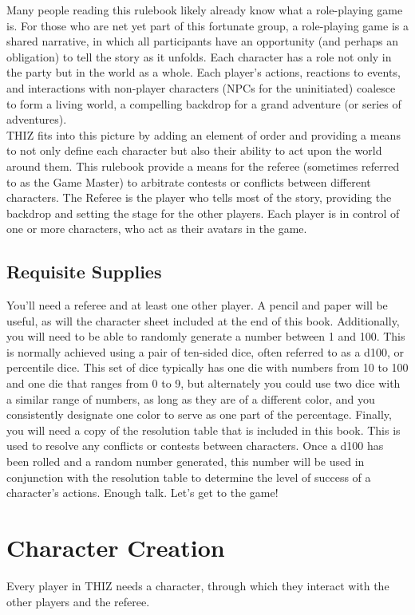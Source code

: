 \documentclass[oneside]{book}
\begin{document}
Many people reading this rulebook likely already know what a role-playing game is. For those who are net yet part of this fortunate group, a role-playing game is a shared narrative, in which all participants have an opportunity (and perhaps an obligation) to tell the story as it unfolds. Each character has a role not only in the party but in 
the world as a whole. Each player's actions, reactions to events, and interactions with non-player characters (NPCs for the uninitiated) coalesce to form a living world, a compelling backdrop for a grand adventure (or series of adventures). \\
THIZ fits into this picture by adding an element of order and providing a means to not only define each character but also their ability to act upon the world around them. This rulebook provide a means for the referee (sometimes referred to as the Game Master) to arbitrate contests or conflicts between different characters. The Referee is the player who tells most of the story, providing the backdrop and setting the stage for the other players. Each player is in control of one or more characters, who act as their avatars in the game. 

\section*{Requisite Supplies}

You'll need a referee and at least one other player. A pencil and paper will be useful, as will the character sheet included at the end of this book. Additionally, you will need to be able to randomly generate a number between 1 and 100. This is normally achieved using a pair of ten-sided dice, often referred to as a d100, or percentile dice.  This set of dice typically has one die with numbers from 10 to 100 and one die that ranges from 0 to 9, but alternately you could use two dice with a similar range of numbers, as long as they are of a different color, and you consistently designate one color to serve as one part of the percentage. Finally, you will need a copy of the resolution table that is included in this book. This is used to resolve any conflicts or contests between characters. Once a d100 has been rolled and a random number generated, this number will be used in conjunction with the resolution table to determine the level of success of a character's actions. Enough talk. Let's get to the game!

\mainmatter
{}

\chapter{Character Creation}
Every player in THIZ needs a character, through which they interact with the other players and the referee.
\end{document}
